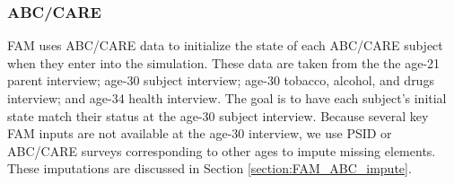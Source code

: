 \subsubsection{ABC/CARE}
\noindent FAM uses ABC/CARE data to initialize the state of each ABC/CARE subject when they enter into the simulation.  
These data are taken from the the age-21 parent interview; age-30 subject interview; age-30 tobacco, alcohol, and drugs interview; and age-34 health interview.  
The goal is to have each subject's initial state match their status at the age-30 subject interview. Because several key FAM inputs are not available at the age-30 interview, we use PSID or ABC/CARE surveys corresponding to other ages to impute missing elements. These imputations are discussed in Section \ref{section:FAM_ABC_impute}. \\

